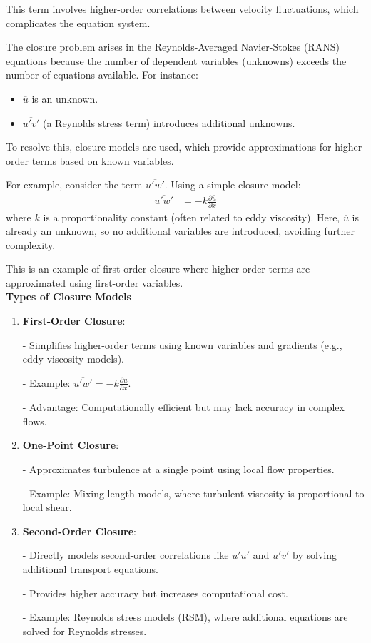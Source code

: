 \documentclass[fleqn,10pt]{SelfArx} %
\begin{document}
This term involves higher-order correlations between velocity fluctuations, which complicates the equation system.

The closure problem arises in the Reynolds-Averaged Navier-Stokes (RANS) equations because the number of dependent variables (unknowns) exceeds the number of equations available. For instance:
\begin{itemize}[noitemsep]
	\item $\overline{u}$ is an unknown.
	\item $\overline{u'v'}$ (a Reynolds stress term) introduces additional unknowns.
\end{itemize}

To resolve this, closure models are used, which provide approximations for higher-order terms based on known variables.

For example, consider the term $\overline{u'w'}$. Using a simple closure model:
\begin{align*}
	\overline{u'w'} & = -k \frac{\partial \bar{u}}{\partial x}
\end{align*}
where $k$ is a proportionality constant (often related to eddy viscosity). Here, $\overline{u}$ is already an unknown, so no additional variables are introduced, avoiding further complexity.

This is an example of first-order closure where higher-order terms are approximated using first-order variables. \\

\textbf{Types of Closure Models}
\begin{enumerate}[noitemsep]
	\item \textbf{First-Order Closure}:

	      - Simplifies higher-order terms using known variables and gradients (e.g., eddy viscosity models).

	      - Example: $\overline{u'w'} = -k \frac{\partial \bar{u}}{\partial x}$.

	      - Advantage: Computationally efficient but may lack accuracy in complex flows.
	\item \textbf{One-Point Closure}:

	      - Approximates turbulence at a single point using local flow properties.

	      - Example: Mixing length models, where turbulent viscosity is proportional to local shear.
	\item \textbf{Second-Order Closure}:

	      - Directly models second-order correlations like $\overline{u'u'}$ and $\overline{u'v'}$ by solving additional transport equations.

	      - Provides higher accuracy but increases computational cost.

	      - Example: Reynolds stress models (RSM), where additional equations are solved for Reynolds stresses.
\end{enumerate}
\end{document}

